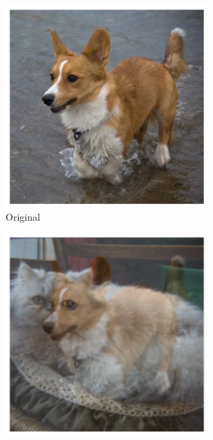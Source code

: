 \begin{figure}[H]
    \centering
    \begin{subfigure}[b]{0.2\textwidth}
        \centering
        \includegraphics[width=\textwidth]{img/introduction/da_original.png}
        \caption{Original}
    \end{subfigure}
    \hspace{1cm}
    \begin{subfigure}[b]{0.2\textwidth}
        \centering
        \includegraphics[width=\textwidth]{img/introduction/da_mixup.png}

\end{subfigure}
\end{figure}

